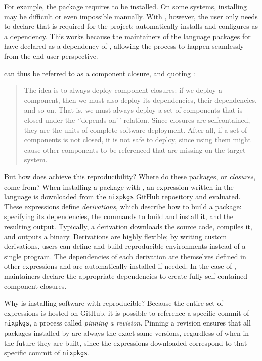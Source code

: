 \documentclass[
  article]{jss}
\begin{document}
For example, the  package requires  to be
installed. On some systems, installing  may be difficult
or even impossible manually. With , however, the user only
needs to declare that  is required for the project; 
automatically installs and configures  as a dependency.
This works because the maintainers of the  language packages
for  have declared  as a dependency of
, allowing the process to happen seamlessly from the end-user
perspective.

 can thus be referred to as a component closure, and quoting
\citet{dolstra2004nix}:

\begin{quote}
The idea is to always deploy component closures: if we deploy a
component, then we must also deploy its dependencies, their
dependencies, and so on. That is, we must always deploy a set of
components that is closed under the `'depends on'\,' relation. Since
closures are selfcontained, they are the units of complete software
deployment. After all, if a set of components is not closed, it is not
safe to deploy, since using them might cause other components to be
referenced that are missing on the target system.
\end{quote}

But how does  achieve this reproducibility? Where do these
packages, or \emph{closures}, come from? When installing a package with
, an expression written in the  language is downloaded
from the \texttt{nixpkgs} GitHub repository and evaluated. These
expressions define \emph{derivations}, which describe how to build a
package: specifying its dependencies, the commands to build and install
it, and the resulting output. Typically, a derivation downloads the
source code, compiles it, and outputs a binary. Derivations are highly
flexible; by writing custom derivations, users can define and build
reproducible environments instead of a single program. The dependencies
of each derivation are themselves defined in other expressions and are
automatically installed if needed. In the case of ,
maintainers declare the appropriate dependencies to create fully
self-contained component closures.

Why is installing software with  reproducible? Because the
entire set of  expressions is hosted on GitHub, it is possible
to reference a specific commit of \texttt{nixpkgs}, a process called
\emph{pinning a revision}. Pinning a revision ensures that all packages
installed by  are always the exact same versions, regardless of
when in the future they are built, since the expressions downloaded
correspond to that specific commit of \texttt{nixpkgs}.
\end{document}
